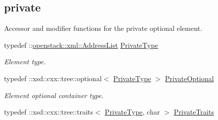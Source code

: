 \subsection*{private}
\label{_amgrp2c17c6393771ee3048ae34d6b380c5ec}
Accessor and modifier functions for the private optional element. \begin{DoxyCompactItemize}
\item 
\hypertarget{classopenstack_1_1xml_1_1Addresses_a336a8009e18fd33136a2d6ba7ad384c6}{
typedef ::\hyperlink{classopenstack_1_1xml_1_1AddressList}{openstack::xml::AddressList} \hyperlink{classopenstack_1_1xml_1_1Addresses_a336a8009e18fd33136a2d6ba7ad384c6}{PrivateType}}
\label{classopenstack_1_1xml_1_1Addresses_a336a8009e18fd33136a2d6ba7ad384c6}

\begin{DoxyCompactList}\small\item\em Element type. \item\end{DoxyCompactList}\item 
\hypertarget{classopenstack_1_1xml_1_1Addresses_a63822dad44c10c954bc42c5af4d7aaaf}{
typedef ::xsd::cxx::tree::optional$<$ \hyperlink{classopenstack_1_1xml_1_1AddressList}{PrivateType} $>$ \hyperlink{classopenstack_1_1xml_1_1Addresses_a63822dad44c10c954bc42c5af4d7aaaf}{PrivateOptional}}
\label{classopenstack_1_1xml_1_1Addresses_a63822dad44c10c954bc42c5af4d7aaaf}

\begin{DoxyCompactList}\small\item\em Element optional container type. \item\end{DoxyCompactList}\item 
\hypertarget{classopenstack_1_1xml_1_1Addresses_a8e568de515fbb3539883b21c870c84b1}{
typedef ::xsd::cxx::tree::traits$<$ \hyperlink{classopenstack_1_1xml_1_1AddressList}{PrivateType}, char $>$ \hyperlink{classopenstack_1_1xml_1_1Addresses_a8e568de515fbb3539883b21c870c84b1}{PrivateTraits}}
\label{classopenstack_1_1xml_1_1Addresses_a8e568de515fbb3539883b21c870c84b1}


\end{DoxyCompactItemize}
